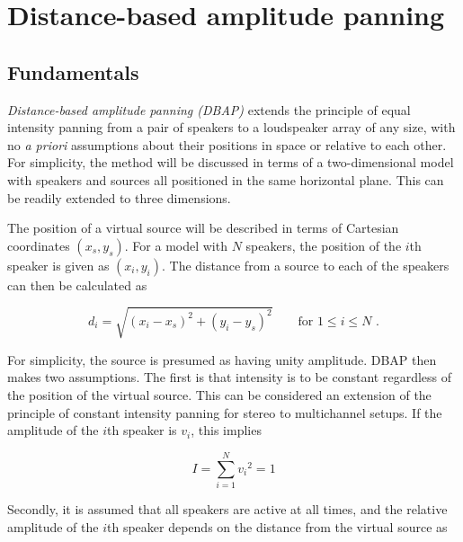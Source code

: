 \documentclass[twoside,10pt]{article}
\begin{document}
\section{Distance-based amplitude panning}

\subsection{Fundamentals}


\textit{Distance-based amplitude panning (DBAP)} extends the principle of equal intensity panning from a pair of speakers to a loudspeaker array of any size, with no \textit{a priori} assumptions about their positions in space or relative to each other.
For simplicity, the method will be discussed in terms of a two-dimensional model with speakers and sources all positioned in the same horizontal plane. This can be readily extended to three dimensions.

The position of a virtual source will be described in terms of Cartesian coordinates $(x_{s}, y_{s})$. For a model with $N$ speakers, the position of the $i$th speaker is given as $(x_{i}, y_{i})$. The distance from a source to each of the speakers can then be calculated as

\begin{equation} \label{eq:distance}
d_{i} = \sqrt{ {(x_{i} - x_{s})}^2 + {(y_{i} - y_{s})}^2 } \qquad \textrm{for } 1 \leq i \leq N \textrm{ .}
\end{equation}

For simplicity, the source is presumed as having unity amplitude. DBAP then makes two assumptions. The first is that intensity is to be constant regardless of the position of the virtual source. This can be considered an extension of the principle of constant intensity panning for stereo to multichannel setups. If the amplitude of the $i$th speaker is $v_{i}$, this implies

\begin{equation} \label{eq:constant_intensity}
I = \sum_{i=1}^{N} {v_{i}}^2 = 1
\end{equation}

Secondly, it is assumed that all speakers are active at all times, and the relative amplitude of the $i$th speaker depends on the distance from the virtual source as 
\end{document}
